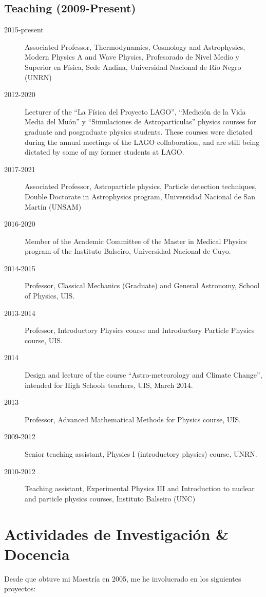 \subsection*{Teaching (2009-Present)}
\begin{description}
	\item[2015-present] Associated Professor, Thermodynamics, Cosmology and Astrophysics, Modern Physics A and Wave Physics, Profesorado de Nivel Medio y Superior en Física, Sede Andina, Universidad Nacional de Río Negro (UNRN)
	\item [2012-2020] Lecturer of the ``La Física del Proyecto LAGO'', ``Medición de la Vida Media del Muón'' y ``Simulaciones de Astropartículas'' physics courses for graduate and posgraduate physics students. These courses were dictated during the annual meetings of the LAGO collaboration, and are still being dictated by some of my former students at LAGO.
	\item[2017-2021] Associated Professor, Astroparticle physics, Particle detection techniques, Double Doctorate in Astrophysics program, Universidad Nacional de San Martín (UNSAM)
	\item[2016-2020] Member of the Academic Committee of the Master in Medical Physics program of the Instituto Balseiro, Universidad Nacional de Cuyo.
	\item[2014-2015] Professor, Classical Mechanics (Graduate) and General Astronomy, School of Physics, UIS.
	\item[2013-2014] Professor, Introductory Physics course and Introductory Particle Physics course, UIS.
	\item[2014] Design and lecture of the course ``Astro-meteorology and Climate Change'', intended for High Schools teachers, UIS, March 2014.
	\item[2013] Professor, Advanced Mathematical Methods for Physics course, UIS.
	\item[2009-2012] Senior teaching assistant, Physics I (introductory physics) course, UNRN.
	\item[2010-2012] Teaching assistant, Experimental Physics III and Introduction to nuclear and particle physics courses, Instituto Balseiro (UNC)
\end{description}
\else
\section*{Actividades de Investigación \& Docencia}

Desde que obtuve mi Maestría en 2005, me he involucrado en los siguientes proyectos:

